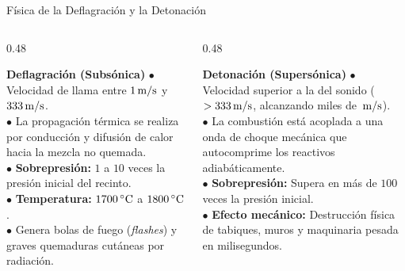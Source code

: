 \begin{frame}{Física de la Deflagración y la Detonación}
  \begin{columns}[T]
    \begin{column}{0.48\textwidth}
      \begin{block}{\textbf{Deflagración (Subsónica)}}
        \small
        $\bullet$ Velocidad de llama entre $1\,\mathrm{m}/\mathrm{s}$ y $333\,\mathrm{m}/\mathrm{s}$.\\
        $\bullet$ La propagación térmica se realiza por conducción y difusión de calor hacia la mezcla no quemada.\\
        $\bullet$ \textbf{Sobrepresión:} $1$ a $10$ veces la presión inicial del recinto.\\
        $\bullet$ \textbf{Temperatura:} $1700\,^\circ\mathrm{C}$ a $1800\,^\circ\mathrm{C}$.\\
        $\bullet$ Genera bolas de fuego (\textit{flashes}) y graves quemaduras cutáneas por radiación.
      \end{block}
    \end{column}

    \begin{column}{0.48\textwidth}
      \begin{alertblock}{\textbf{Detonación (Supersónica)}}
        \small
        $\bullet$ Velocidad superior a la del sonido ($> 333\,\mathrm{m}/\mathrm{s}$, alcanzando miles de $\,\mathrm{m}/\mathrm{s}$).\\
        $\bullet$ La combustión está acoplada a una onda de choque mecánica que autocomprime los reactivos adiabáticamente.\\
        $\bullet$ \textbf{Sobrepresión:} Supera en más de $100$ veces la presión inicial.\\
        $\bullet$ \textbf{Efecto mecánico:} Destrucción física de tabiques, muros y maquinaria pesada en milisegundos.
      \end{alertblock}
    \end{column}
  \end{columns}
\end{frame}

